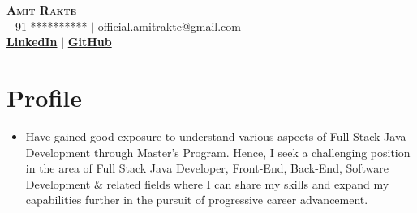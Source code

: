 \documentclass[letterpaper,11pt]{article}
\begin{document}




\begin{center}
    \textbf{\Huge \scshape Amit Rakte} \\ \vspace{1pt}
    \small +91 ********** $|$ \href{official.amitrakte@gmail.com}{{official.amitrakte@gmail.com}}    \\ 
    \small  
    \href{http://linkedin.com/in/amitrakte/}{\bf LinkedIn} $|$
    \href{http://github.com/Ameet-Rakte}{\bf GitHub} 
    
\end{center}



\section{Profile}
\begin{itemize}[leftmargin=0.15in, label={}]
\item 
Have gained good exposure to understand various aspects of Full Stack Java Development through Master’s Program. Hence, I seek a challenging position in the area of Full Stack Java Developer, Front-End, Back-End, Software Development & related fields where I can share my skills and expand my capabilities further in the pursuit of progressive career advancement.
\end{itemize}
\end{document}
